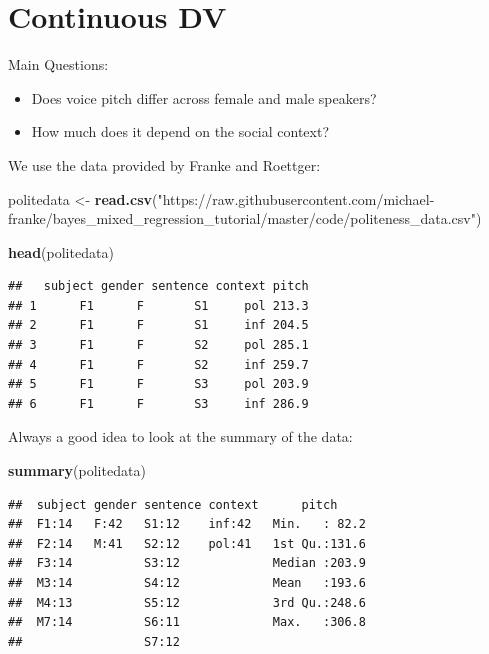 \documentclass[]{book}
\newenvironment{Shaded}{\begin{snugshade}}{\end{snugshade}}
\newcommand{\KeywordTok}[1]{\textcolor[rgb]{0.13,0.29,0.53}{\textbf{#1}}}
\newcommand{\NormalTok}[1]{#1}
\newcommand{\StringTok}[1]{\textcolor[rgb]{0.31,0.60,0.02}{#1}}
\providecommand{\tightlist}{%
  \setlength{\itemsep}{0pt}\setlength{\parskip}{0pt}}
\begin{document}
\hypertarget{continuous-dv}{%
\section{Continuous DV}\label{continuous-dv}}

Main Questions:

\begin{itemize}
\tightlist
\item
  Does voice pitch differ across female and male speakers?
\item
  How much does it depend on the social context?
\end{itemize}

We use the data provided by Franke and Roettger:

\begin{Shaded}
\begin{Highlighting}[]
\NormalTok{politedata <-}\StringTok{ }\KeywordTok{read.csv}\NormalTok{(}\StringTok{"https://raw.githubusercontent.com/michael-franke/bayes_mixed_regression_tutorial/master/code/politeness_data.csv"}\NormalTok{)}

\KeywordTok{head}\NormalTok{(politedata)}
\end{Highlighting}
\end{Shaded}

\begin{verbatim}
##   subject gender sentence context pitch
## 1      F1      F       S1     pol 213.3
## 2      F1      F       S1     inf 204.5
## 3      F1      F       S2     pol 285.1
## 4      F1      F       S2     inf 259.7
## 5      F1      F       S3     pol 203.9
## 6      F1      F       S3     inf 286.9
\end{verbatim}

Always a good idea to look at the summary of the data:

\begin{Shaded}
\begin{Highlighting}[]
\KeywordTok{summary}\NormalTok{(politedata)}
\end{Highlighting}
\end{Shaded}

\begin{verbatim}
##  subject gender sentence context      pitch      
##  F1:14   F:42   S1:12    inf:42   Min.   : 82.2  
##  F2:14   M:41   S2:12    pol:41   1st Qu.:131.6  
##  F3:14          S3:12             Median :203.9  
##  M3:14          S4:12             Mean   :193.6  
##  M4:13          S5:12             3rd Qu.:248.6  
##  M7:14          S6:11             Max.   :306.8  
##                 S7:12
\end{verbatim}
\end{document}
